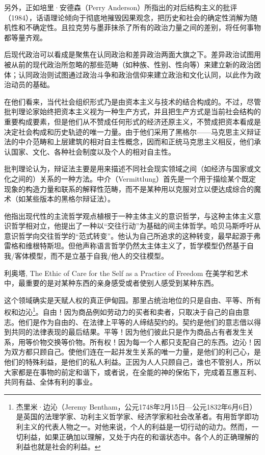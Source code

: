 另外，正如培里·安德森（Perry Anderson）所指出的对后结构主义的批评（1984），话语理论倾向于彻底地摧毁因果观念，把历史和社会的确定性消解为随机性和不确定性。且拉克劳与墨菲抹杀了所有的政治力量之间的差别，将任何事物都等量齐观。

后现代政治可以看成是聚焦在认同政治和差异政治两面大旗之下。差异政治试图用被从前的现代政治所忽略的那些范畴（如种族、性别、性向等）来建立新的政治团体；认同政治则试图通过政治斗争和政治信仰来建立政治和文化认同，以此作为政治动员的基础。


在他们看来，当代社会组织形式乃是由资本主义与技术的结合构成的。不过，尽管批判理论家始终把资本主义视为一种生产方式，并且把生产方式是当前社会结构的重要构成要素，但是他们从不赞成任何形式的经济还原主义，不赞成把资本看成是决定社会构成和历史轨迹的唯一力量。由于他们采用了黑格尔——马克思主义辩证法的中介范畴和上层建筑的相对自主性概念，因而和正统马克思主义相反，他们承认国家、文化、各种社会制度以及个人的相对自主性。

批判理论认为，辩证法主要是用来描述不同社会现实领域之间（如经济与国家或文化之间的）关系的一种方法。中介（Vermittlung）首先是一个用于描绘某个既定现象的构造力量和联系的解释性范畴，而不是某种用以克服对立以便达成综合的魔术（如某些版本的黑格尔辩证法）。

他指出现代性的主流哲学观点植根于一种主体主义的意识哲学，与这种主体主义意识哲学相对立，他提出了一种以“交往行动”为基础的间主体哲学。哈贝马斯呼吁从意识哲学向交往哲学的“范式转变”。他认为自己所追求的这种转变，最早起源于弗雷格和维根特斯坦。但他声称语言哲学仍然太主体主义了，哲学模型仍然基于自我/客体模型，而不是立基于自我/他人的交往模型。

利奥塔, The Ethic of Care for the Self as a Practice of Freedom 在美学和艺术中，最重要的是对某种东西的亲身感受或者使别人感受到某种东西。




这个领域确实是天赋人权的真正伊甸园。那里占统治地位的只是自由、平等、所有权和边沁\footnote{杰里米·边沁（Jeremy Bentham，公元1748年2月15日—公元1832年6月6日）是英国的法理学家、功利主义哲学家、经济学家和社会改革者。有用哲学即功利主义的代表人物之一。对他来说，个人的利益是一切行动的动力。然而，一切利益，如果正确加以理解，又处于内在的和谐状态中。各个人的正确理解的利益也就是社会的利益。}。自由！因为商品例如劳动力的买者和卖者，只取决于自己的自由意志。他们是作为自由的、在法律上平等的人缔结契约的。契约是他们的意志借以得到共同的法律表现的最后结果。平等！因为他们彼此只是作为商品占有者发生关系，用等价物交换等价物。所有权！因为每一个人都只支配自己的东西。边沁！因为双方都只顾自己。使他们连在一起并发生关系的唯一力量，是他们的利己心，是他们的特殊利益，是他们的私人利益。正因为人人只顾自己，谁也不管别人，所以大家都是在事物的前定和谐下，或者说，在全能的神的保佑下，完成着互惠互利、共同有益、全体有利的事业。